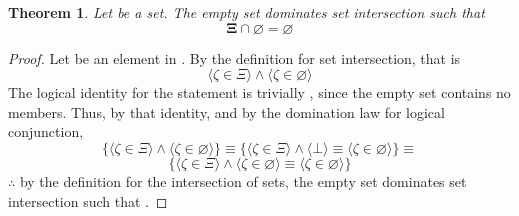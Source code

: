 \documentclass[preview]{standalone}
\newtheorem{theorem}{Theorem}
\begin{document}
\begin{theorem} %
    Let \bm{$\Xi$} be a set. 
    The empty set dominates set intersection such that
    \begin{equation*}
        \bm{\Xi \cap \varnothing = \varnothing}
    \end{equation*}
\end{theorem}
\begin{proof}
    Let \bm{$\zeta$} be an element in \bm{$\Xi \cap \varnothing$}. 
    By the definition for set intersection, that is 
    \begin{equation*}
        \Big \langle \zeta \in \Xi \Big \rangle 
            \land 
        \Big \langle \zeta \in \varnothing \Big \rangle
    \end{equation*}
    The logical identity for the statement \bm{$\zeta \in \varnothing$} is trivially \bm{$\bot$}, 
    since the empty set contains no members. 
    Thus, by that identity, 
    and by the domination law for logical conjunction,
    \begin{equation*}
        \Bigg\{
            \Big \langle \zeta \in \Xi \Big \rangle 
                \land 
            \Big \langle \zeta \in \varnothing \Big \rangle
        \Bigg\}
            \equiv
        \Bigg\{
            \Big \langle \zeta \in \Xi \Big \rangle 
                \land 
            \Big \langle \bot \Big \rangle
                \equiv
            \Big \langle \zeta \in \varnothing \Big \rangle
        \Bigg\}
            \equiv
    \end{equation*}
    \begin{equation*}
        \Bigg\{
            \Big \langle \zeta \in \Xi \Big \rangle 
                \land 
            \Big \langle \zeta \in \varnothing \Big \rangle
                \equiv
            \Big \langle \zeta \in \varnothing \Big \rangle
        \Bigg\}
    \end{equation*}
    $\therefore$ by the definition for the intersection of sets,
    the empty set dominates set intersection such that 
    \bm{$\Xi \cap \varnothing = \varnothing$}.
\end{proof}
\end{document}
